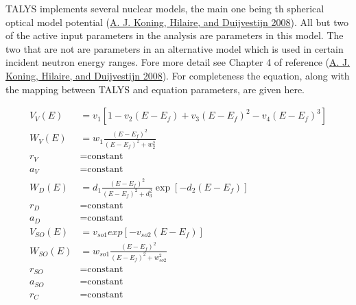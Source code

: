 \documentclass[
  12pt,
  a4paper,
  twoside]{book}
\begin{document}
TALYS implements several nuclear models, the main one being th spherical optical model potential (\protect\hyperlink{ref-talys}{A. J. Koning, Hilaire, and Duijvestijn 2008}). All but two of the active input parameters in the analysis are parameters in this model. The two that are not are parameters in an alternative model which is used in certain incident neutron energy ranges. Fore more detail see Chapter 4 of reference (\protect\hyperlink{ref-talys}{A. J. Koning, Hilaire, and Duijvestijn 2008}). For completeness the equation, along with the mapping between TALYS and equation parameters, are given here.

\begin{align}
\label{eq:omp-equation}
V_V(E) &= v_1 \left[ 1 - v_2 (E - E_f) + v_3(E - E_f)^2 - v_4(E-E_f)^3 \right]\\ \nonumber
W_V(E) &= w_1 \frac{(E-E_f)^2}{(E-E_f)^2 + w_2^2} \\ \nonumber
r_V &= \textrm{constant}\\ \nonumber
a_V &= \textrm{constant}\\ \nonumber
W_D(E) &= d_1 \frac{(E-E_f)^2}{(E-E_f)^2 + d_3^2}\exp\left[-d_2(E-E_f) \right] \\ \nonumber
r_D &= \textrm{constant}\\ \nonumber
a_D &= \textrm{constant}\\ \nonumber
V_{SO}(E) &= v_{so1} exp\left[ -v_{so2}(E-E_f)\right] \\ \nonumber
W_{SO}(E) &= w_{so1} \frac{(E-E_f)^2}{(E-E_f)^2 + w_{so2}^2}\\ \nonumber
r_{SO} &= \textrm{constant}\\ \nonumber
a_{SO} &= \textrm{constant}\\ \nonumber
r_C &= \textrm{constant}
\end{align}
\end{document}
